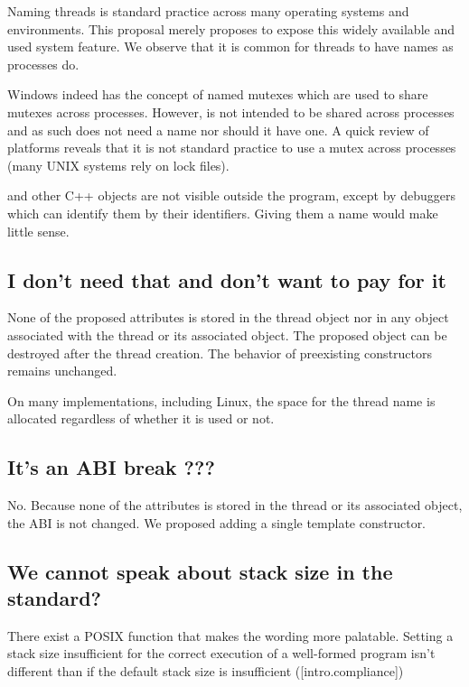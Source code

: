 \documentclass{wg21}
\begin{document}
Naming threads is standard practice across many operating systems and environments.
This proposal merely proposes to expose this widely available and used system feature.
We observe that it is common for threads to have names as processes do.

Windows indeed has the concept of named mutexes which are used to share mutexes across processes.
However,  is not intended to be shared across processes and as such does not need
a name nor should it have one.
A quick review of platforms reveals that it is not standard practice to use a mutex across processes (many UNIX systems rely on lock files).

 and other C++ objects are not visible outside the program, except by debuggers which can identify them
by their identifiers. Giving them a name would make little sense.


\subsection{I don't need that and don't want to pay for it}

None of the proposed attributes is stored in the thread object nor in any object associated with the thread or its associated  object.
The proposed  object can be destroyed after the thread creation.
The behavior of preexisting constructors remains unchanged.

On many implementations, including Linux, the space for the thread name is allocated regardless of whether it is used or not.

\subsection{It's an ABI break ???}

No.
Because none of the attributes is stored in the thread or its associated  object, the ABI is not changed.
We proposed adding a single template constructor.


\subsection{We cannot speak about stack size in the standard?}
There exist a POSIX function that makes the wording more palatable.
Setting a stack size insufficient for the correct execution of a well-formed program isn't different
than if the default stack size is insufficient ([intro.compliance])
\end{document}
